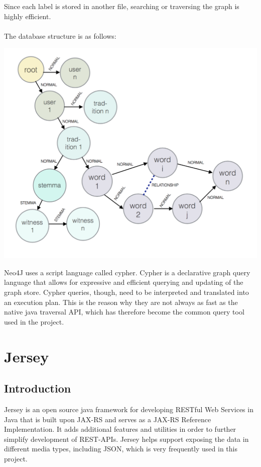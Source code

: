 \documentclass[11pt,fleqn,openany]{book} %
\begin{document}
Since each label is stored in another file, searching or traversing the graph is highly efficient. \\ \quad \\ The database structure is as follows:
\begin{center}
\includegraphics[scale=.5]{Pictures/database.png} 
\end{center} 
Neo4J uses a script language called cypher. Cypher is a declarative graph query language that allows for expressive and efficient querying and updating of the graph store. Cypher queries, though, need to be interpreted and translated into an execution plan. This is the reason why they are not always as fast as the native java traversal API, which has therefore become the common query tool used in the project.



\chapter{Jersey}

\section*{Introduction}
Jersey is an open source java framework for developing RESTful Web Services in Java that is built upon JAX-RS and serves as a JAX-RS Reference Implementation. It adds additional features and utilities in order to further simplify development of REST-APIs. Jersey helps support exposing the data in different media types, including JSON, which is very frequently used in this project. 
\end{document}
